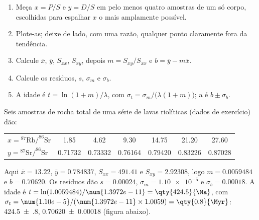 \begin{method}\label{met:b1:radiometric-methods:isochron}
\begin{enumerate}
  \item Meça $x = P/S$ e $y = D/S$ em pelo menos quatro amostras de um só corpo, escolhidas
        para espalhar $x$ o mais amplamente possível.
  \item Plote-as; deixe de lado, com uma razão, qualquer ponto claramente fora da tendência.
  \item Calcule $\bar x$, $\bar y$, $S_{xx}$, $S_{xy}$, depois $m = S_{xy}/S_{xx}$ e
        $b = \bar y - m \bar x$.
  \item Calcule os resíduos, $s$, $\sigma_m$ e $\sigma_b$.
  \item A idade é $t = \ln(1+m)/\lambda$, com $\sigma_t =
        \sigma_m/\bigl(\lambda(1+m)\bigr)$; a  é $b \pm \sigma_b$.
\end{enumerate}
\end{method}

\begin{example}\label{ex:b1:radiometric-methods:rhyolite}
Seis amostras de rocha total de uma série de lavas riolíticas (dados de exercício) dão:
\begin{center}
\small
\begin{tabular}{|l|cccccc|}
\hline
$x = {}^{87}\mathrm{Rb}/^{86}\mathrm{Sr}$ & 1.85 & 4.62 & 9.30 & 14.75 & 21.20 & 27.60 \\
$y = {}^{87}\mathrm{Sr}/^{86}\mathrm{Sr}$ & 0.71732 & 0.73332 & 0.76164 & 0.79420 & 0.83226 & 0.87028 \\
\hline
\end{tabular}
\end{center}
Aqui $\bar x = 13.22$, $\bar y = 0.784837$, $S_{xx} = 491.41$ e
$S_{xy} = 2.92308$, logo $m = 0.0059484$ e $b = 0.70620$. Os resíduos dão
$s = 0.00024$, $\sigma_m = \num{1.10e-5}$ e $\sigma_b = 0.00018$. A idade é
$t = \ln(1.0059484)/\num{1.3972e-11} = \qty{424.5}{\Ma}$, com
$\sigma_t = \num{1.10e-5}/(\num{1.3972e-11} \times 1.0059) = \qty{0.8}{\Myr}$:
\qty[uncertainty-mode=separate]{424.5(8)}{\Ma}, 
\num[uncertainty-mode=separate]{0.70620(18)} (figura abaixo).
\end{example}


